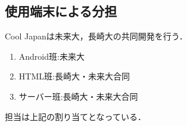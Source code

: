 \subsection{使用端末による分担}
\par
Cool Japanは未来大，長崎大の共同開発を行う．
\begin{enumerate}
\item Android班:未来大
\item HTML班:長崎大・未来大合同
\item サーバー班:長崎大・未来大合同
\end{enumerate}
\par
担当は上記の割り当てとなっている．
